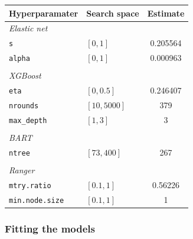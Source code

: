 \documentclass[
]{article}
\newenvironment{Shaded}{\begin{snugshade}}{\end{snugshade}}
\newcommand{\DocumentationTok}[1]{\textcolor[rgb]{0.56,0.35,0.01}{\textbf{\textit{#1}}}}
\newcommand{\FunctionTok}[1]{\textcolor[rgb]{0.00,0.00,0.00}{#1}}
\newcommand{\NormalTok}[1]{#1}
\newcommand{\SpecialCharTok}[1]{\textcolor[rgb]{0.00,0.00,0.00}{#1}}
\begin{document}
\begin{longtable}[]{@{}llc@{}}
\toprule()
\textbf{Hyperparamater} & \textbf{Search space} & \textbf{Estimate} \\
\midrule()
\endhead
\emph{Elastic net} & & \\
\texttt{s} & \([0,1]\) & 0.205564 \\
\texttt{alpha} & \([0,1]\) & 0.000963 \\
& & \\
\emph{XGBoost} & & \\
\texttt{eta} & \([0,0.5]\) & 0.246407 \\
\texttt{nrounds} & \([10,5000]\) & 379 \\
\texttt{max\_depth} & \([1,3]\) & 3 \\
& & \\
\emph{BART} & & \\
\texttt{ntree} & \([73,400]\) & 267 \\
& & \\
\emph{Ranger} & & \\
\texttt{mtry.ratio} & \([0.1,1]\) & 0.56226 \\
\texttt{min.node.size} & \([0.1,1]\) & 1 \\
\bottomrule()
\end{longtable}

\hypertarget{fitting-the-models}{%
\subsubsection{Fitting the models}\label{fitting-the-models}}

\begin{Shaded}
\end{Shaded}
\end{document}
